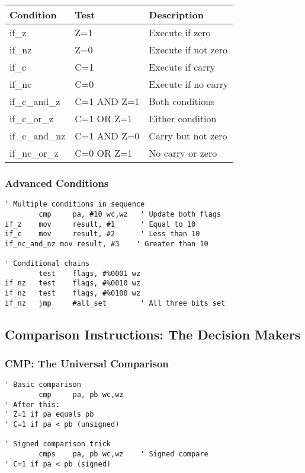\documentclass[11pt]{book}
\begin{document}
\begin{longtable}[]{@{}lll@{}}
\toprule
Condition & Test & Description \\
\midrule
\endhead
if\_z & Z=1 & Execute if zero \\
if\_nz & Z=0 & Execute if not zero \\
if\_c & C=1 & Execute if carry \\
if\_nc & C=0 & Execute if no carry \\
if\_c\_and\_z & C=1 AND Z=1 & Both conditions \\
if\_c\_or\_z & C=1 OR Z=1 & Either condition \\
if\_c\_and\_nz & C=1 AND Z=0 & Carry but not zero \\
if\_nc\_or\_z & C=0 OR Z=1 & No carry or zero \\
\bottomrule
\end{longtable}

\hypertarget{advanced-conditions}{%
\subsubsection{Advanced Conditions}\label{advanced-conditions}}

\begin{lstlisting}
' Multiple conditions in sequence
        cmp     pa, #10 wc,wz   ' Update both flags
if_z    mov     result, #1      ' Equal to 10
if_c    mov     result, #2      ' Less than 10
if_nc_and_nz mov result, #3    ' Greater than 10

' Conditional chains
        test    flags, #%0001 wz
if_nz   test    flags, #%0010 wz
if_nz   test    flags, #%0100 wz
if_nz   jmp     #all_set        ' All three bits set
\end{lstlisting}

\hypertarget{comparison-instructions-the-decision-makers}{%
\subsection{Comparison Instructions: The Decision
Makers}\label{comparison-instructions-the-decision-makers}}

\hypertarget{cmp-the-universal-comparison}{%
\subsubsection{CMP: The Universal
Comparison}\label{cmp-the-universal-comparison}}

\begin{lstlisting}
' Basic comparison
        cmp     pa, pb wc,wz
' After this:
' Z=1 if pa equals pb
' C=1 if pa < pb (unsigned)

' Signed comparison trick
        cmps    pa, pb wc,wz    ' Signed compare
' C=1 if pa < pb (signed)
\end{lstlisting}
\end{document}
